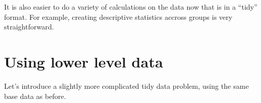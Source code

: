 \documentclass[]{book}
\newenvironment{Shaded}{\begin{snugshade}}{\end{snugshade}}
\newcommand{\DataTypeTok}[1]{\textcolor[rgb]{0.13,0.29,0.53}{#1}}
\newcommand{\KeywordTok}[1]{\textcolor[rgb]{0.13,0.29,0.53}{\textbf{#1}}}
\newcommand{\NormalTok}[1]{#1}
\newcommand{\OperatorTok}[1]{\textcolor[rgb]{0.81,0.36,0.00}{\textbf{#1}}}
\newcommand{\StringTok}[1]{\textcolor[rgb]{0.31,0.60,0.02}{#1}}
\begin{document}
\begin{Shaded}
\end{Shaded}

\hypertarget{htmlwidget-bf8d8040a86ab82b3540}{}

It is also easier to do a variety of calculations on the data now that is in a ``tidy'' format. For example, creating descriptive statistics accross groups is very straightforward.

\begin{Shaded}
\end{Shaded}

\hypertarget{using-lower-level-data}{%
\section{Using lower level data}\label{using-lower-level-data}}

Let's introduce a slightly more complicated tidy data problem, using the same base data as before.
\end{document}
